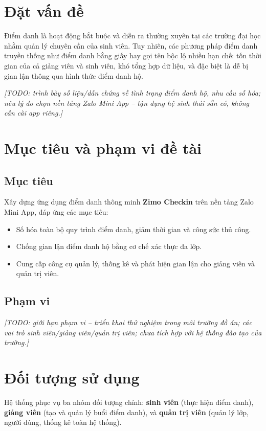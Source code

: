 \documentclass[../main.tex]{subfiles}
\begin{document}
\section{Đặt vấn đề}
Điểm danh là hoạt động bắt buộc và diễn ra thường xuyên tại các trường đại học nhằm quản lý chuyên cần của sinh viên. Tuy nhiên, các phương pháp điểm danh truyền thống như điểm danh bằng giấy hay gọi tên bộc lộ nhiều hạn chế: tốn thời gian của cả giảng viên và sinh viên, khó tổng hợp dữ liệu, và đặc biệt là dễ bị gian lận thông qua hình thức điểm danh hộ.

\textit{[TODO: trình bày số liệu/dẫn chứng về tình trạng điểm danh hộ, nhu cầu số hóa; nêu lý do chọn nền tảng Zalo Mini App -- tận dụng hệ sinh thái sẵn có, không cần cài app riêng.]}

\section{Mục tiêu và phạm vi đề tài}
\subsection{Mục tiêu}
Xây dựng ứng dụng điểm danh thông minh \textbf{Zimo Checkin} trên nền tảng Zalo Mini App, đáp ứng các mục tiêu:
\begin{itemize}
    \item Số hóa toàn bộ quy trình điểm danh, giảm thời gian và công sức thủ công.
    \item Chống gian lận điểm danh hộ bằng cơ chế xác thực đa lớp.
    \item Cung cấp công cụ quản lý, thống kê và phát hiện gian lận cho giảng viên và quản trị viên.
\end{itemize}

\subsection{Phạm vi}
\textit{[TODO: giới hạn phạm vi -- triển khai thử nghiệm trong môi trường đồ án; các vai trò sinh viên/giảng viên/quản trị viên; chưa tích hợp với hệ thống đào tạo của trường.]}

\section{Đối tượng sử dụng}
Hệ thống phục vụ ba nhóm đối tượng chính: \textbf{sinh viên} (thực hiện điểm danh), \textbf{giảng viên} (tạo và quản lý buổi điểm danh), và \textbf{quản trị viên} (quản lý lớp, người dùng, thống kê toàn hệ thống).
\end{document}
